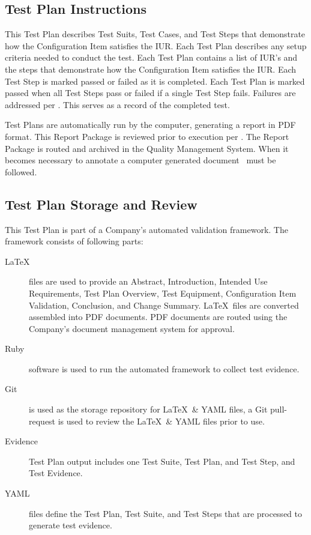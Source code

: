 \subsection{Test Plan Instructions}
This Test Plan describes Test Suits, Test Cases, and Test Steps that demonstrate
how the Configuration Item satisfies the IUR\@.  Each Test Plan describes any
setup criteria needed to conduct the test.  Each Test Plan contains a list of
IUR's and the steps that demonstrate how the Configuration Item
satisfies the IUR\@.  Each Test Step is marked passed or failed as it is
completed.  Each Test Plan is marked passed when all Test Steps pass or failed
if a single Test Step fails.  Failures are addressed per \sopISS\@. This serves as
a record of the completed
test.

\tlcVspace

Test Plans are automatically run by the computer, generating a report in PDF
format.  This Report Package is reviewed prior to execution per \sopSDLC\@.  The
Report Package is routed and archived in the Quality Management System.  When it
becomes necessary to annotate a computer generated document \sopGDP\ must be
followed.

\subsection{Test Plan Storage and Review}
This Test Plan is part of a Company's automated validation framework.  The
framework consists of following parts:
\begin{description}
  \item[\LaTeX] files are used to provide an Abstract, Introduction, Intended
    Use Requirements, Test Plan Overview, Test Equipment, Configuration
    Item Validation, Conclusion, and Change Summary.  \LaTeX\ files are converted
    assembled into PDF documents.  PDF documents are routed using the Company's
    document management system for approval.

  \item[Ruby] software is used to run the automated framework to collect test
    evidence.

  \item[Git] is used as the storage repository for \LaTeX\ \& YAML files, a Git
    pull-request is used to review the \LaTeX\ \& YAML files prior to use.

  \item[Evidence] Test Plan output includes one Test Suite, Test Plan, and Test
    Step, and Test Evidence.

  \item[YAML] files define the Test Plan, Test Suite, and Test Steps that are
    processed to generate test evidence.
\end{description}

